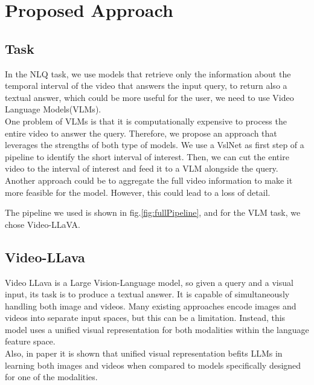 \documentclass[10pt,twocolumn,letterpaper]{article}
\begin{document}
\section{Proposed Approach}
\subsection{Task}
In the NLQ task, we use models that retrieve only the
information about the temporal interval of the video that
answers the input query, to return also a textual answer,
which could be more useful for the user, we need to use
Video Language Models(VLMs).\\
One problem of VLMs is that it is computationally expensive to process the entire video to answer the query. Therefore, we propose an approach that leverages the strengths of both type of models. We use a VslNet as first step of a pipeline to identify the short interval of interest. Then, we can cut the entire video to the interval of interest and feed it to a VLM alongside the query.
Another approach could be to aggregate the full video information to make it more feasible for the model. However, this could lead to a loss of detail.

The pipeline we used is shown in fig.\ref{fig:fullPipeline}, and for the VLM task, we chose Video-LLaVA.

\subsection{Video-LLava}
Video LLava is a Large Vision-Language model, so given a query and a visual input, its task is to produce a textual answer.  It is capable of simultaneously handling both image and videos. Many existing approaches encode images and videos into separate input spaces, but this can be a limitation. Instead, this model uses a unified visual representation for both modalities within the language feature space.\\
Also, in paper \cite{b8} it is shown that unified visual representation befits LLMs in learning both images and videos when compared to models specifically designed for one of the modalities.
\end{document}
